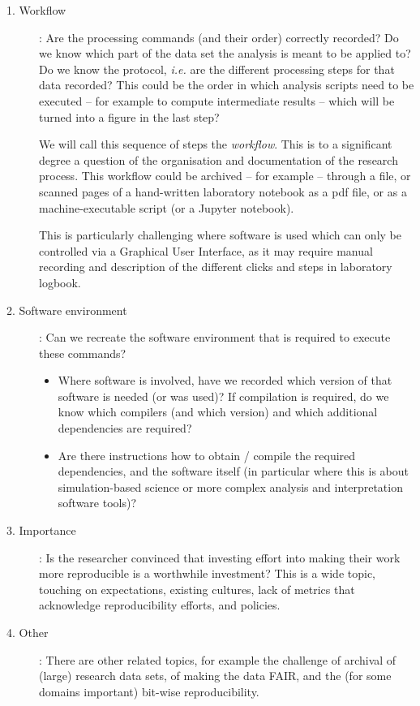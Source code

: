 \begin{description}
\item[1. Workflow]: Are the processing commands (and their order)
correctly recorded? Do we know which part of the data set the analysis is meant to be applied to? Do we know the protocol, \emph{i.e.} are the different processing steps for that data recorded? This could be the order in which analysis scripts need to be executed -- for example to compute intermediate results -- which will be turned into a figure in the last step?

We will call this sequence of steps the \emph{workflow}. This is to a significant degree a question of the organisation and documentation of the research process. This workflow could be archived -- for example -- through a  file, or scanned pages of a hand-written laboratory notebook as a pdf file, or as a
machine-executable script (or a Jupyter notebook).

This is particularly challenging where software is used which can only be
controlled via a Graphical User Interface, as it may require manual recording
and description of the different clicks and steps in laboratory logbook.

\item[2. Software environment]: Can we recreate the software environment that is required to execute these commands?
\begin{itemize}
\item Where software is involved, have we recorded which version of that software is needed (or was used)? If compilation is required, do we know which compilers (and which version) and which additional dependencies are required?
\item Are there instructions how to obtain / compile the required dependencies,
and the software itself (in particular where this is about simulation-based
science or more complex analysis and interpretation software tools)?
\end{itemize}

\item[3. Importance]: Is the researcher convinced that investing effort into making
their work more reproducible is a worthwhile investment? This is a wide topic,
touching on expectations, existing cultures, lack of metrics that acknowledge
reproducibility efforts, and policies.

\item[4. Other]: There are other related topics, for example the challenge of
archival of (large) research data sets, of making the data FAIR, and the (for
some domains important) bit-wise reproducibility.
\end{description}

